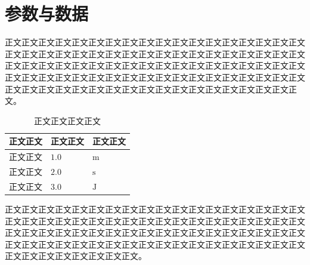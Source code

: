 \section{参数与数据}
正文正文正文正文正文正文正文正文正文正文正文正文正文正文正文正文正文正文正文正文正文正文正文正文正文正文正文正文正文正文正文正文正文正文正文正文正文正文正文正文正文正文正文正文正文正文正文正文正文正文正文正文正文正文正文正文正文正文正文正文正文正文正文正文正文正文正文正文正文正文正文正文正文正文正文正文正文正文正文正文正文正文正文正文正文正文正文正文正文正文。

\begin{table}[htbp]
  \centering\songti{}
  \caption{正文正文正文正文}\label{tab:parameters}
  \begin{tabular}{@{}lll@{}}
    \toprule 正文正文 & 正文正文 & 正文正文 \\
    \midrule 正文正文 & $1.0$ & $\mathrm{m}$ \\
    正文正文 & $2.0$ & $\mathrm{s}$ \\
    正文正文 & $3.0$ & $\mathrm{J}$ \\
    \bottomrule
  \end{tabular}
\end{table}
正文正文正文正文正文正文正文正文正文正文正文正文正文正文正文正文正文正文正文正文正文正文正文正文正文正文正文正文正文正文正文正文正文正文正文正文正文正文正文正文正文正文正文正文正文正文正文正文正文正文正文正文正文正文正文正文正文正文正文正文正文正文正文正文正文正文正文正文正文正文正文正文正文正文正文正文正文正文正文正文。

